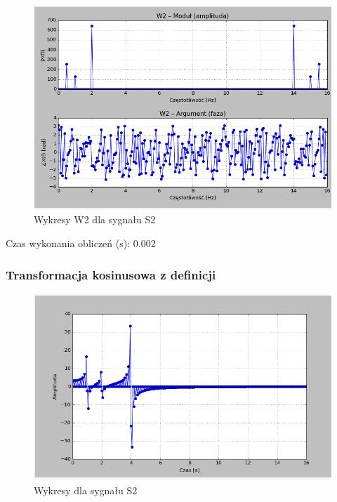 \documentclass{article}
\begin{document}
{                \begin{figure}[h!]
                    \centering
                    \includegraphics[width=1\textwidth]{img/w2s2_2.png}
                    \caption{Wykresy W2 dla sygnału S2}
                \end{figure}
                \FloatBarrier

                Czas wykonania obliczeń (s): 0.002

            \subsubsection{Transformacja kosinusowa z definicji}

            
                \begin{figure}[h!]
                    \centering
                    \includegraphics[width=1\textwidth]{img/dcts2.png}
                    \caption{Wykresy dla sygnału S2}
                \end{figure}
                \FloatBarrier

}
\end{document}
